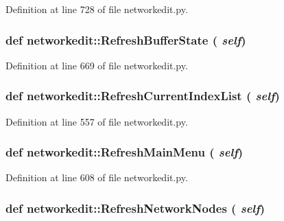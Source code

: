 Definition at line 728 of file networkedit.py.\hypertarget{namespacenetworkedit_74f3ac94488160a26836197de52b9fd2}{
\subsubsection[RefreshBufferState]{\setlength{\rightskip}{0pt plus 5cm}def networkedit::Refresh\-Buffer\-State ( {\em self})}}
\label{namespacenetworkedit_74f3ac94488160a26836197de52b9fd2}




Definition at line 669 of file networkedit.py.\hypertarget{namespacenetworkedit_6d8b2e2a672b5c89f1cef538d21517c4}{
\subsubsection[RefreshCurrentIndexList]{\setlength{\rightskip}{0pt plus 5cm}def networkedit::Refresh\-Current\-Index\-List ( {\em self})}}
\label{namespacenetworkedit_6d8b2e2a672b5c89f1cef538d21517c4}




Definition at line 557 of file networkedit.py.\hypertarget{namespacenetworkedit_f35165c7e88dca205c83933033dff40d}{
\subsubsection[RefreshMainMenu]{\setlength{\rightskip}{0pt plus 5cm}def networkedit::Refresh\-Main\-Menu ( {\em self})}}
\label{namespacenetworkedit_f35165c7e88dca205c83933033dff40d}




Definition at line 608 of file networkedit.py.\hypertarget{namespacenetworkedit_81036ca384b8cf75d0010851755d8317}{
\subsubsection[RefreshNetworkNodes]{\setlength{\rightskip}{0pt plus 5cm}def networkedit::Refresh\-Network\-Nodes ( {\em self})}}
\label{namespacenetworkedit_81036ca384b8cf75d0010851755d8317}




